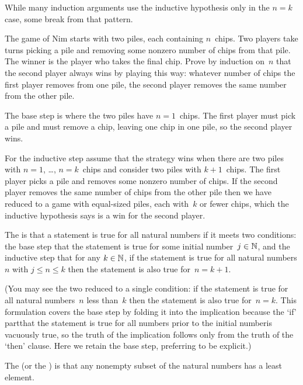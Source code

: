 \documentclass{ibl}  %
\begin{document}
\noindent
While many induction arguments use the inductive 
hypothesis only in the $n=k$ case,
some break from that pattern.

\begin{ex}
The game of Nim starts with two piles, each containing $n$~chips.
Two players take turns picking a pile and removing 
some nonzero number of chips from that pile. 
The winner is the player who takes the final chip.
Prove by induction on~$n$ that the second player always wins by
playing this way: whatever number of chips the first player removes
from one pile, the second player removes the same number from the other pile.
\begin{ans}
The base step is where the two piles have $n=1$~chips.
The first player must pick a pile and must remove a chip, leaving one chip
in one pile, so the second player wins.

For the inductive step assume that the strategy wins when there are two piles
with $n=1$, \ldots, $n=k$~chips and consider two piles with
$k+1$~chips.
The first player picks a pile and removes some nonzero number of chips.
If the second player removes the same number of chips from the other
pile then we have reduced to a game with equal-sized piles, each
with~$k$ or fewer chips, which the inductive hypothesis says
is a win for the second player.  
\end{ans}
\end{ex}

\begin{df}
The  is that a
statement is true for all natural numbers if it
meets two conditions: the base step that the statement is true for some
initial number~$j\in\mathbb{N}$,
and the inductive step that for any $k\in\mathbb{N}$, 
if the statement is true for 
all natural numbers $n$ with $j\leq n\leq k$ then the
statement is also true for~$n=k+1$.  
\end{df}

\noindent (You may see the two reduced to a single condition: 
if the statement is true for all natural numbers~$n$ less than~$k$
then the statement is also true for~$n=k$.
This formulation covers the base step by folding it into the 
implication because
the `if' part\Dash that the statement is true for all numbers prior to
the initial number\Dash is vacuously true, so the truth of the implication
follows only from the truth of the `then' clause.
Here we retain the base step, preferring to be explicit.)

\begin{df}
The  
(or the )
is that any nonempty 
subset of the natural
numbers has a least element.  
\end{df}
\end{document}

